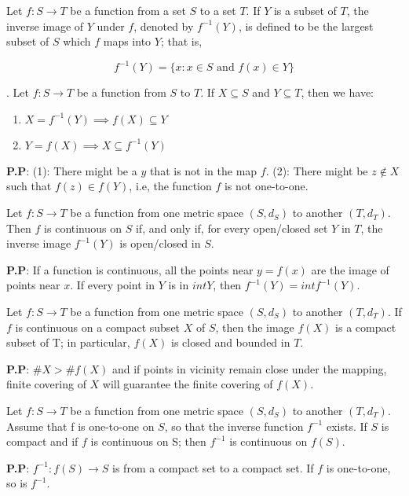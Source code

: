 \documentclass[10pt,a4paper]{book}
\begin{document}
\begin{deff}
 Let $f : S \rightarrow T$ be a function from a set $S$ to a set $T$. If $Y$ is a subset of $T$, the inverse image of $Y$ under $f$, denoted by $f^{-1}(Y)$, is defined to be the largest subset of $S$ which $f$ maps into $Y$; that is, 
 
  $$f^{-1}(Y) = \{x: x \in S \text{  and  } f(x) \in Y \}$$
\end{deff}

\begin{Thm}
. Let $f : S \rightarrow T$ be a function from $S$ to $T$. If $X \subseteq S$ and $Y \subseteq T$, then we have:
\begin{enumerate}
    \item $X = f^{-1}(Y) \implies f(X) \subseteq Y$
    \item $Y = f(X) \implies X \subseteq f^{-1}(Y)$
\end{enumerate}
\end{Thm}
\noindent \textbf{P.P}: (1): There might be a $y$ that is not in the map $f$. (2): There might be $z \notin X$ such that $f(z) \in f(Y)$, i.e, the function $f$ is not one-to-one. 

\begin{Thm}
Let $f : S \rightarrow T$ be a function from one metric space $(S, d_S)$ to another $(T, d_T)$. Then $f$ is continuous on $S$ if, and only if, for every open/closed set $Y$ in $T$, the inverse image $f^{-1}(Y)$ is open/closed in $S$.

\end{Thm}
\noindent \textbf{P.P}: If a function is continuous, all the points near $y =  f(x)$ are the image of points near $x$. If every point in $Y$ is in $int Y$, then $f^{-1}(Y) = int f^{-1}(Y) $.

\begin{Thm}
Let $f : S \rightarrow T $ be a function from one metric space $(S, d_S)$ to another $(T, d_T)$. If $f$ is continuous on a compact subset $X$ of $S$, then the image $f(X)$ is a compact subset of T; in particular, $f(X)$ is closed and bounded in $T$.
\end{Thm}
\noindent \textbf{P.P}: $\#X > \#f(X)$ and if points in vicinity remain close under the mapping, finite covering of $X$ will guarantee the finite covering of $f(X)$. 


\begin{Thm}
Let $f : S \rightarrow T$ be a function from one metric space $(S, d_S)$ to another $(T, d_T)$. Assume that f is one-to-one on $S$, so that the inverse function $f ^{-1}$ exists. If $S$ is compact and if $f$ is continuous on S; then $f^{-1}$ is continuous on $f(S)$.

\end{Thm}
\noindent \textbf{P.P}: $f^{-1}: f(S) \rightarrow S$ is from a compact set to a compact set. If $f$ is one-to-one, so is $f^{-1}$.
\end{document}
